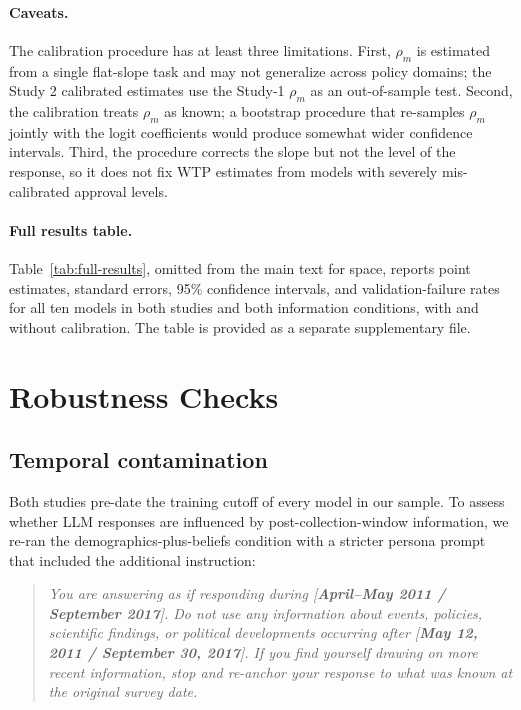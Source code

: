 \documentclass[12pt]{article}
\begin{document}
\paragraph{Caveats.} The calibration procedure has at least three limitations. First, $\rho_m$ is estimated from a single flat-slope task and may not generalize across policy domains; the Study 2 calibrated estimates use the Study-1 $\rho_m$ as an out-of-sample test. Second, the calibration treats $\rho_m$ as known; a bootstrap procedure that re-samples $\rho_m$ jointly with the logit coefficients would produce somewhat wider confidence intervals. Third, the procedure corrects the slope but not the level of the response, so it does not fix WTP estimates from models with severely mis-calibrated approval levels.

\paragraph{Full results table.} Table~\ref{tab:full-results}, omitted from the main text for space, reports point estimates, standard errors, 95\% confidence intervals, and validation-failure rates for all ten models in both studies and both information conditions, with and without calibration. The table is provided as a separate supplementary file.

\section{Robustness Checks}\label{app:robustness}

\subsection{Temporal contamination}

Both studies pre-date the training cutoff of every model in our sample. To assess whether LLM responses are influenced by post-collection-window information, we re-ran the demographics-plus-beliefs condition with a stricter persona prompt that included the additional instruction:

\begin{quote}\itshape
\footnotesize
You are answering as if responding during [\textbf{April--May 2011 / September 2017}]. Do not use any information about events, policies, scientific findings, or political developments occurring after [\textbf{May 12, 2011 / September 30, 2017}]. If you find yourself drawing on more recent information, stop and re-anchor your response to what was known at the original survey date.
\end{quote}
\end{document}
